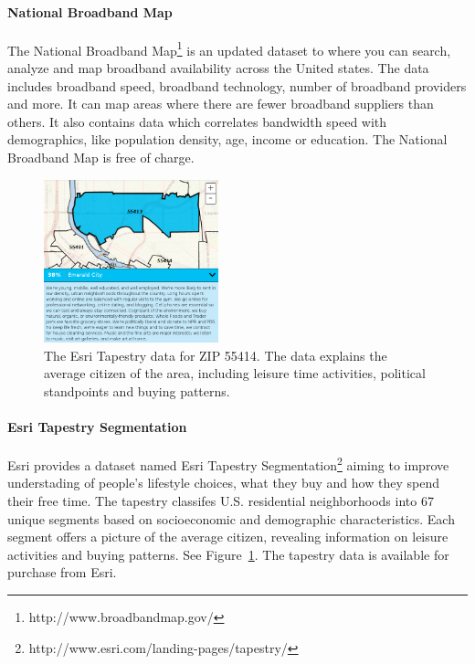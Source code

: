 \documentclass[twocolumn]{article}
\begin{document}
\paragraph{National Broadband Map}
\label{par:National Broadband Map}
The National Broadband Map\footnote{http://www.broadbandmap.gov/} is an updated dataset to where you can search, analyze and map broadband availability across the United states. The data includes broadband speed, broadband technology, number of broadband providers and more. It can map areas where there are fewer broadband suppliers than others. It also contains data which correlates bandwidth speed with demographics, like population density, age, income or education. The National Broadband Map is free of charge.

\begin{figure}
  \centering
  \includegraphics[width=0.45\textwidth]{img/tapestry.png}
  \caption{The Esri Tapestry data for ZIP 55414. The data explains the average citizen of the area, including leisure time activities, political standpoints and buying patterns.}
  \label{fig:tapestry}
\end{figure}
\paragraph{Esri Tapestry Segmentation}
\label{par:Esri Tapestry Segmentation}
Esri provides a dataset named Esri Tapestry Segmentation\footnote{http://www.esri.com/landing-pages/tapestry/} aiming to improve understading of people's lifestyle choices, what they buy and how they spend their free time. The tapestry classifes U.S. residential neighborhoods into 67 unique segments based on socioeconomic and demographic characteristics. Each segment offers a picture of the average citizen, revealing information on leisure activities and buying patterns. See Figure~\ref{fig:tapestry}. The tapestry data is available for purchase from Esri.
\end{document}
